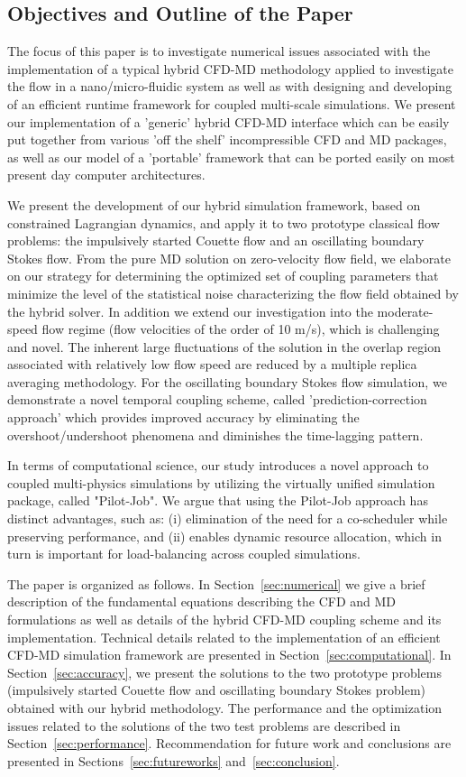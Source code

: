 \documentclass[preprint,12pt]{elsarticle}
\begin{document}
\subsection{Objectives and Outline of the Paper}

The focus of this paper is to investigate numerical issues associated with the implementation of a typical hybrid CFD-MD methodology applied to investigate the flow in a nano/micro-fluidic system as well as with designing and developing of an efficient runtime framework for coupled multi-scale simulations. We present our implementation of a 'generic' hybrid CFD-MD interface which can be easily put together from various 'off the shelf' incompressible CFD and MD packages, as well as our model of a 'portable' framework that can be ported easily on most present day computer architectures. 

We present the development of our hybrid simulation framework, based on constrained Lagrangian dynamics, and apply it to two prototype classical flow problems: the impulsively started Couette flow and an oscillating boundary Stokes flow.
From the pure MD solution on zero-velocity flow field, we elaborate on our strategy for determining the optimized set of coupling parameters that minimize the level of the statistical noise characterizing the flow field obtained by the hybrid solver. 
In addition we extend our investigation into the moderate-speed flow regime (flow velocities of the order of 10 m/s), which is challenging and novel. The inherent large fluctuations of the solution in the overlap region associated with relatively low flow speed are reduced by a multiple replica averaging methodology. For the oscillating boundary Stokes flow simulation, we demonstrate a novel temporal coupling scheme, called 'prediction-correction approach' which provides improved accuracy by eliminating the overshoot/undershoot phenomena and diminishes the time-lagging pattern.

In terms of computational science, our study introduces a novel approach to coupled multi-physics simulations by utilizing the virtually unified simulation package, called "Pilot-Job". We argue that using the Pilot-Job approach has distinct advantages, such as: (i) elimination of the need for a co-scheduler while preserving performance, and (ii) enables dynamic resource allocation, which in turn is important for load-balancing across coupled simulations. 

The paper is organized as follows. In Section~\ref{sec:numerical} we give a brief description of the fundamental equations describing the CFD and MD formulations as well as details of the hybrid CFD-MD coupling scheme and its implementation. Technical details related to the implementation of an efficient CFD-MD simulation framework are presented in Section~\ref{sec:computational}. In Section~\ref{sec:accuracy}, we present the solutions to the two prototype problems (impulsively started Couette flow and oscillating boundary Stokes problem) obtained with our hybrid methodology. The performance and the optimization issues related to the solutions of the two test problems are described in Section~\ref{sec:performance}. Recommendation for future work and conclusions are presented in Sections~\ref{sec:futureworks} and~\ref{sec:conclusion}.
\end{document}
